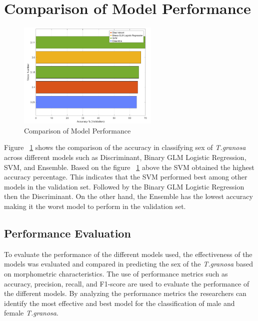 \section{Comparison of Model Performance}
\begin{figure}[!htbp]
	\centering
	\includegraphics[width=0.6\textwidth]{figures/compare-models.png}
	\caption{Comparison of Model Performance}
	\label{fig:compare-models}
\end{figure}

Figure ~\ref{fig:compare-models} shows the comparison of the accuracy in classifying sex of \textit{T.granosa} across different models such as Discriminant, Binary GLM Logistic Regression, SVM, and Ensemble. Based on the figure ~\ref{fig:compare-models} above the SVM obtained the highest accuracy percentage. This indicates that the SVM performed best among other models in the validation set. Followed by the Binary GLM Logistic Regression then the Discriminant. On the other hand, the Ensemble has the lowest accuracy making it the worst model to perform in the validation set. 

\subsection{Performance Evaluation}

To evaluate the performance of the different models used, the effectiveness of the models was evaluated and compared in predicting the sex of the \textit{T.granosa} based on morphometric characteristics. The use of performance metrics such as accuracy, precision, recall, and F1-score are used to evaluate the performance of the different models. By analyzing the performance metrics the researchers can identify the most effective and best model for the classification of male and female \textit{T.granosa}. 


